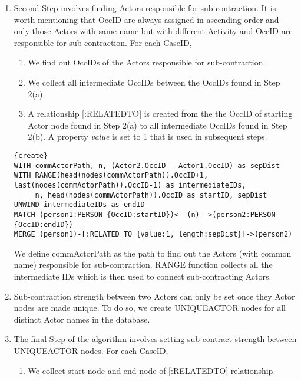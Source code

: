 \documentclass[11pt]{article}
\begin{document}
{{{\begin{enumerate}
\item Second Step involves finding Actors responsible for sub-contraction. It is worth mentioning that OccID are always assigned in ascending order and only those Actors with same name but with different Activity and OccID are responsible for sub-contraction. For each CaseID,
\begin{enumerate}
\item We find out OccIDs of the Actors responsible for sub-contraction.
\item We collect all intermediate OccIDs between the OccIDs found in Step 2(a).
\item A relationship [:RELATED\textunderscore TO] is created from the the OccID of starting Actor node found in Step 2(a) to all intermediate OccIDs found in Step 2(b). A property \textit{value} is set to 1 that is used in subsequent steps.
\end{enumerate}
\lstset{language=SQL} 
\begin{lstlisting}{create}
WITH commActorPath, n, (Actor2.OccID - Actor1.OccID) as sepDist
WITH RANGE(head(nodes(commActorPath)).OccID+1, last(nodes(commActorPath)).OccID-1) as intermediateIDs,
     n, head(nodes(commActorPath)).OccID as startID, sepDist
UNWIND intermediateIDs as endID
MATCH (person1:PERSON {OccID:startID})<--(n)-->(person2:PERSON {OccID:endID})
MERGE (person1)-[:RELATED_TO {value:1, length:sepDist}]->(person2)
\end{lstlisting}
We define commActorPath as the path to find out the Actors (with common name) responsible for sub-contraction. RANGE function collects all the intermediate IDs which is then used to connect sub-contracting Actors.
\item Sub-contraction strength between two Actors can only be set once they Actor nodes are made unique. To do so, we create UNIQUEACTOR nodes for all distinct Actor names in the database.
\item The final Step of the algorithm involves setting sub-contract strength between UNIQUEACTOR nodes. For each CaseID,
\begin{enumerate}
\item We collect start node and end node of [:RELATED\textunderscore TO] relationship.

\end{enumerate}
\end{enumerate}}}}
\end{document}

